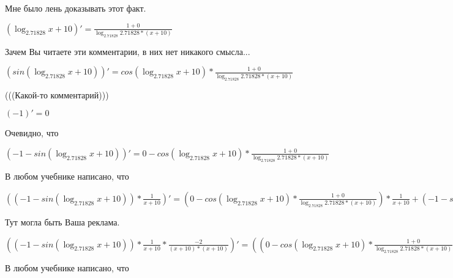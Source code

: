 \documentclass[12pt,a4paper,fleqn]{article}
\theoremstyle{definition}
\begin{document}
Мне было лень доказывать этот факт.

$(\log_{ 2.71828 }{ x  +  10 })' = \frac{ 1  +  0 }{\log_{ 2.71828 }{ 2.71828 } * ( x  +  10 )}
$

Зачем Вы читаете эти комментарии, в них нет никакого смысла...

$(sin(\log_{ 2.71828 }{ x  +  10 }))' = cos(\log_{ 2.71828 }{ x  +  10 }) * \frac{ 1  +  0 }{\log_{ 2.71828 }{ 2.71828 } * ( x  +  10 )}
$

(((Какой-то комментарий)))

$( -1 )' =  0 $

Очевидно, что

$( -1  - sin(\log_{ 2.71828 }{ x  +  10 }))' =  0  - cos(\log_{ 2.71828 }{ x  +  10 }) * \frac{ 1  +  0 }{\log_{ 2.71828 }{ 2.71828 } * ( x  +  10 )}
$

В любом учебнике написано, что

$(( -1  - sin(\log_{ 2.71828 }{ x  +  10 })) * \frac{ 1 }{ x  +  10 }
)' = ( 0  - cos(\log_{ 2.71828 }{ x  +  10 }) * \frac{ 1  +  0 }{\log_{ 2.71828 }{ 2.71828 } * ( x  +  10 )}
) * \frac{ 1 }{ x  +  10 }
 + ( -1  - sin(\log_{ 2.71828 }{ x  +  10 })) * \frac{ 0  * ( x  +  10 ) -  1  * ( 1  +  0 )}{( x  +  10 ) * ( x  +  10 )}
$

Тут могла быть Ваша реклама.

$(( -1  - sin(\log_{ 2.71828 }{ x  +  10 })) * \frac{ 1 }{ x  +  10 }
 * \frac{ -2 }{( x  +  10 ) * ( x  +  10 )}
)' = (( 0  - cos(\log_{ 2.71828 }{ x  +  10 }) * \frac{ 1  +  0 }{\log_{ 2.71828 }{ 2.71828 } * ( x  +  10 )}
) * \frac{ 1 }{ x  +  10 }
 + ( -1  - sin(\log_{ 2.71828 }{ x  +  10 })) * \frac{ 0  * ( x  +  10 ) -  1  * ( 1  +  0 )}{( x  +  10 ) * ( x  +  10 )}
) * \frac{ -2 }{( x  +  10 ) * ( x  +  10 )}
 + ( -1  - sin(\log_{ 2.71828 }{ x  +  10 })) * \frac{ 1 }{ x  +  10 }
 * \frac{ 0  * ( x  +  10 ) * ( x  +  10 ) -  -2  * (( 1  +  0 ) * ( x  +  10 ) + ( x  +  10 ) * ( 1  +  0 ))}{( x  +  10 ) * ( x  +  10 ) * ( x  +  10 ) * ( x  +  10 )}
$

В любом учебнике написано, что
\end{document}
